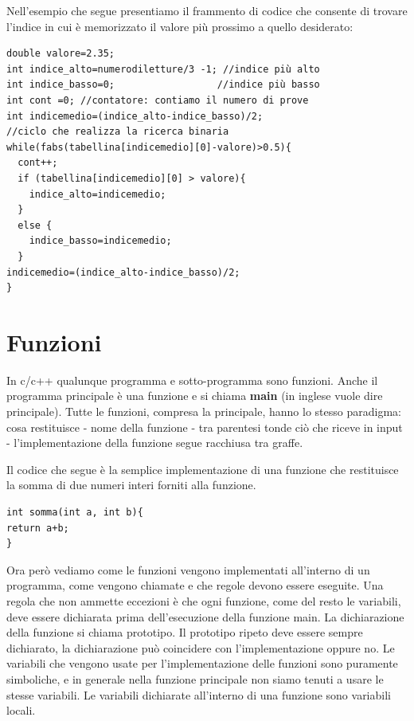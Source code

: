 \documentclass[11pt,fleqn]{book} %
\begin{document}
Nell'esempio che segue presentiamo il frammento di codice che consente di trovare l'indice in cui è memorizzato il valore più prossimo a quello desiderato:

\begin{verbatim}
double valore=2.35;
int indice_alto=numerodiletture/3 -1; //indice più alto 
int indice_basso=0;			         //indice più basso 
int cont =0; //contatore: contiamo il numero di prove
int indicemedio=(indice_alto-indice_basso)/2;
//ciclo che realizza la ricerca binaria
while(fabs(tabellina[indicemedio][0]-valore)>0.5){			
  cont++;		
  if (tabellina[indicemedio][0] > valore){
    indice_alto=indicemedio;
  }
  else {
    indice_basso=indicemedio;       
  }
indicemedio=(indice_alto-indice_basso)/2;
}
\end{verbatim}


\section{Funzioni}

In c/c++ qualunque programma e sotto-programma sono funzioni. Anche il programma principale è una funzione e si chiama \textbf{main} (in inglese vuole dire principale). Tutte le funzioni, compresa la principale, hanno lo stesso paradigma: cosa restituisce - nome della funzione - tra parentesi tonde ciò che riceve in input - l'implementazione della funzione segue racchiusa tra graffe.

Il codice che segue è la semplice implementazione di una funzione che  restituisce la somma di due numeri interi forniti alla funzione.
\begin{verbatim}
int somma(int a, int b){
return a+b;
}
\end{verbatim}

Ora però vediamo come le funzioni vengono implementati all'interno di un programma, come vengono chiamate e che regole devono essere eseguite.
Una regola che non ammette eccezioni è che ogni funzione, come del resto le variabili, deve essere dichiarata prima dell'esecuzione della funzione main. La dichiarazione della funzione si chiama prototipo. Il prototipo ripeto deve essere sempre dichiarato, la dichiarazione può coincidere con l'implementazione oppure no.
Le variabili che vengono usate per l'implementazione delle funzioni sono puramente simboliche, e in generale nella funzione principale non siamo tenuti a usare le stesse variabili.
Le variabili dichiarate all'interno di una funzione sono variabili locali.
\end{document}
